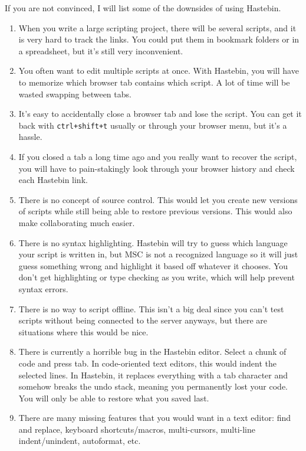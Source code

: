 \documentclass[oneside]{book}
\begin{document}
If you are not convinced, I will list some of the downsides of using Hastebin.
\begin{enumerate}
    \item When you write a large scripting project, there will be several scripts, and it is very hard to track the links. You could put them in bookmark folders or in a spreadsheet, but it's still very inconvenient.
    \item You often want to edit multiple scripts at once. With Hastebin, you will have to memorize which browser tab contains which script. A lot of time will be wasted swapping between tabs.
    \item It's easy to accidentally close a browser tab and lose the script. You can get it back with \texttt{ctrl+shift+t} usually or through your browser menu, but it's a hassle.
    \item If you closed a tab a long time ago and you really want to recover the script, you will have to pain-stakingly look through your browser history and check each Hastebin link.
    \item There is no concept of source control. This would let you create new versions of scripts while still being able to restore previous versions. This would also make collaborating much easier.
    \item There is no syntax highlighting. Hastebin will try to guess which language your script is written in, but MSC is not a recognized language so it will just guess something wrong and highlight it based off whatever it chooses. You don't get highlighting or type checking as you write, which will help prevent syntax errors.
    \item There is no way to script offline. This isn't a big deal since you can't test scripts without being connected to the server anyways, but there are situations where this would be nice.
    \item There is currently a horrible bug in the Hastebin editor. Select a chunk of code and press tab. In code-oriented text editors, this would indent the selected lines. In Hastebin, it replaces everything with a tab character and somehow breaks the undo stack, meaning you permanently lost your code. You will only be able to restore what you saved last.
    \item There are many missing features that you would want in a text editor: find and replace, keyboard shortcuts/macros, multi-cursors, multi-line indent/unindent, autoformat, etc.
\end{enumerate}
\end{document}
